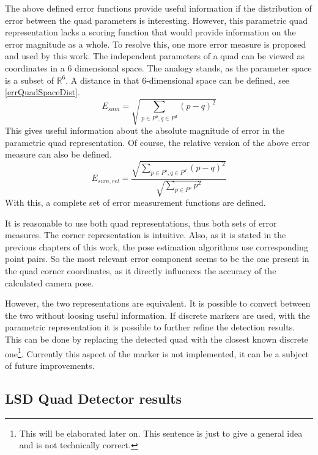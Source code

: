 The above defined error functions provide useful information if the distribution of error between the quad parameters is interesting.
However, this parametric quad representation lacks a scoring function that would provide information on the error magnitude as a whole.
To resolve this, one more error measure is proposed and used by this work.
The independent parameters of a quad can be viewed as coordinates in a 6 dimensional space.
The analogy stands, as the parameter space is a subset of $\mathbb{R}^6$.
A distance in that 6-dimensional space can be defined, see \eqref{errQuadSpaceDist}.
\begin{equation}
	E_{sum} = \sqrt{\sum_{p \in P^o, q \in P^d} (p - q)^2}
	\label{eq:errQuadSpaceDist}
\end{equation}
This gives useful information about the absolute magnitude of error in the parametric quad representation.
Of course, the relative version of the above error measure can also be defined.
\begin{equation}
E_{sum, rel} = \frac{\sqrt{\sum_{p \in P^o, q \in P^d} (p - q)^2}}{\sqrt{\sum_{p \in P^o} p^2}}
\label{eq:errQuadSpaceDistRel}
\end{equation}
With this, a complete set of error measurement functions are defined.

It is reasonable to use both quad representations, thus both sets of error measures.
The corner representation is intuitive.
Also, as it is stated in the previous chapters of this work, the pose estimation algorithms use corresponding point pairs.
So the most relevant error component seems to be the one present in the quad corner coordinates, as it directly influences the accuracy of the calculated camera pose.

However, the two representations are equivalent.
It is possible to convert between the two without loosing useful information.
If discrete markers are used, with the parametric representation it is possible to further refine the detection results.
This can be done by replacing the detected quad with the closest known discrete one\footnote{This will be elaborated later on. This sentence is just to give a general idea and is not technically correct.}.
Currently this aspect of the marker is not implemented, it can be a subject of future improvements.

\subsection{LSD Quad Detector results}

